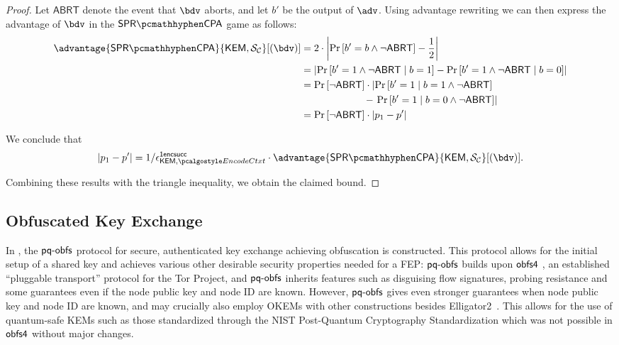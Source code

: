 \begin{proof}
    Let $\mathsf{ABRT}$ denote the event that $\bdv$ aborts, and let $b'$ be the output of $\adv$. Using advantage rewriting we can then express the advantage of $\bdv$ in the $\sprcpa$ game as follows:
    \begin{align*}
        \advantage{\sprcpa}{\KEM, \simulunif}[(\bdv)]
        &=
        2 \cdot \left|
            \Pr\left[b'=b \land \neg \mathsf{ABRT} \right] - \frac{1}{2}
        \right| \\
        &=
        \left|
            \Pr\left[b'=1 \land \neg \mathsf{ABRT} \mid b=1 \right] - \Pr\left[b'=1 \land \neg \mathsf{ABRT} \mid b=0 \right]
        \right| \\
        &=
        \Pr\left[\neg \mathsf{ABRT}\right] \cdot
        \left|
            \Pr\left[b'=1 \mid b=1 \land \neg \mathsf{ABRT} \right]
        \right.\\   
        &\qquad\qquad\qquad\  - \left.
            \Pr\left[b'=1 \mid b=0 \land \neg \mathsf{ABRT} \right]
        \right| \\
        &=
        \Pr\left[\neg \mathsf{ABRT}\right] \cdot
        \left|
            p_1 - p'
        \right|
    \end{align*}

    We conclude that
    \[
    \left| p_1 - p' \right| = 1/\epsilon^\firstencapssuccess_{\KEM,\encodectxt} \cdot \advantage{\sprcpa}{\KEM, \simulunif}[(\bdv)].
    \]
    
    Combining these results with the triangle inequality, we obtain the claimed bound.
\end{proof}

\subsection{Obfuscated Key Exchange}

In \cite{CCS:GunSteVei24}, the $\textsf{pq-obfs}$ protocol for secure, authenticated key exchange achieving obfuscation is constructed. This protocol allows for the initial setup of a shared key and achieves various other desirable security properties needed for a FEP:
$\textsf{pq-obfs}$ builds upon $\textsf{obfs4}$ \cite{obfs4}, an established ``pluggable transport'' protocol for the Tor Project, and $\textsf{pq-obfs}$ inherits features such as disguising flow signatures, probing resistance and some guarantees even if the node public key and node ID are known.
However, $\textsf{pq-obfs}$ gives even stronger guarantees when node public key and node ID are known, and may crucially also employ OKEMs with other constructions besides \textsf{Elligator2}~\cite{CCS:BHKL13}. This allows for the use of quantum-safe KEMs such as those standardized through the NIST Post-Quantum Cryptography Standardization \cite{nist-standardization} which was not possible in $\textsf{obfs4}$ without major changes.

